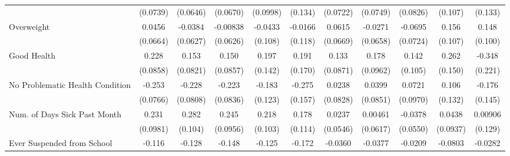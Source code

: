 {\begin{tabular}{l*{10}{c}}
            &    (0.0739)         &    (0.0646)         &    (0.0670)         &    (0.0998)         &     (0.134)         &    (0.0722)         &    (0.0749)         &    (0.0826)         &     (0.107)         &     (0.133)         \\
\addlinespace
Overweight  &      0.0456         &     -0.0384         &    -0.00838         &     -0.0433         &     -0.0166         &      0.0615         &     -0.0271         &     -0.0695         &       0.156         &       0.148         \\
            &    (0.0664)         &    (0.0627)         &    (0.0626)         &     (0.108)         &     (0.118)         &    (0.0669)         &    (0.0658)         &    (0.0724)         &     (0.107)         &     (0.100)         \\
\addlinespace
Good Health &       0.228\sym{**} &       0.153         &       0.150         &       0.197         &       0.191         &       0.133         &       0.178         &       0.142         &       0.262         &      -0.348         \\
            &    (0.0858)         &    (0.0821)         &    (0.0857)         &     (0.142)         &     (0.170)         &    (0.0871)         &    (0.0962)         &     (0.105)         &     (0.150)         &     (0.221)         \\
\addlinespace
No Problematic Health Condition&      -0.253\sym{***}&      -0.228\sym{**} &      -0.223\sym{**} &      -0.183         &      -0.275         &      0.0238         &      0.0399         &      0.0721         &       0.106         &      -0.176         \\
            &    (0.0766)         &    (0.0808)         &    (0.0836)         &     (0.123)         &     (0.157)         &    (0.0828)         &    (0.0851)         &    (0.0970)         &     (0.132)         &     (0.145)         \\
\addlinespace
Num. of Days Sick Past Month&       0.231\sym{*}  &       0.282\sym{**} &       0.245\sym{*}  &       0.218\sym{*}  &       0.178         &      0.0237         &     0.00461         &     -0.0378         &      0.0438         &     0.00906         \\
            &    (0.0981)         &     (0.104)         &    (0.0956)         &     (0.103)         &     (0.114)         &    (0.0546)         &    (0.0617)         &    (0.0550)         &    (0.0937)         &     (0.129)         \\
\addlinespace
Ever Suspended from School&      -0.116\sym{*}  &      -0.128\sym{*}  &      -0.148\sym{**} &      -0.125         &      -0.172         &     -0.0360         &     -0.0377         &     -0.0209         &     -0.0803         &     -0.0282         \\

\end{tabular}}
